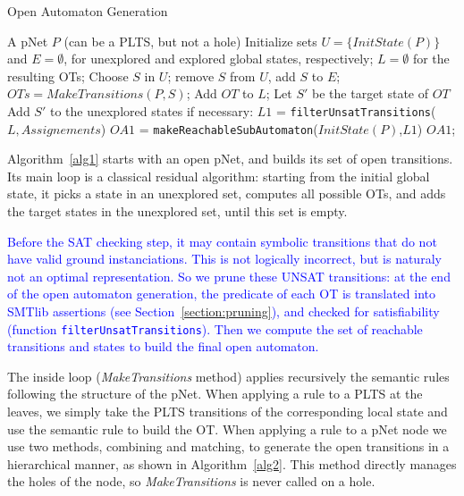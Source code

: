 \documentclass[smallcondensed]{svjour3}
\newcommand{\ERIC}[1]{\textcolor{blue}{#1}}
\newcommand{\QIN}[1]{\textcolor{airforceblue}{#1}}
\begin{document}
\begin{algorithm}[h]
  \caption{Open Automaton Generation}
  \label{alg1}
\begin{algorithmic}[1]
\Require A pNet $P$ (can be a PLTS, but not a hole)
\State Initialize sets $U=\{\mathit{InitState}(P)\}$ and $E=\emptyset$,
for unexplored and explored global states, respectively; $L=\emptyset$ for the resulting OTs;
	\State Choose $S$ in $U$; remove $S$ from $U$, add $S$ to $E$;
	\State $\mathit{OTs} = \mathit{MakeTransitions}(P, S)$;
          \State Add $\mathit{OT}$ to $L$;
          \State Let $S'$ be the target state of $\mathit{OT}$
          Add $S'$ to the unexplored states if necessary:
	  \EndFor
\EndWhile
\State \QIN{$\mathit{L1}$ = \texttt{filterUnsatTransitions}($\mathit{L,Assignements}$)}
\State \QIN{$\mathit{OA1}$ = \texttt{makeReachableSubAutomaton}($\mathit{InitState}(P)$,$\mathit{L1}$)}
\State \Return $\mathit{OA1}$;

\end{algorithmic}  
\end{algorithm}

Algorithm~\ref{alg1} starts with an open pNet, and builds its set of open
transitions. Its main loop is a classical residual algorithm: starting
from the initial global state, it picks a state in an unexplored set, 
computes all possible OTs, and adds the target states in the
unexplored set, until this set is empty.

\ERIC{Before the SAT checking step, it may contain symbolic transitions that
do not have valid ground instanciations. This is not logically
incorrect, but is naturaly not an optimal representation. So we prune
these UNSAT transitions: at the end of the open automaton generation,
the predicate of each OT is translated 
into SMTlib assertions (see Section~\ref{section:pruning}), and checked for
satisfiability (function \texttt{filterUnsatTransitions}). 
Then we compute the set of reachable transitions and states to build
the final open automaton.}

The inside loop (\emph{MakeTransitions} method) applies recursively
the semantic rules following the structure of the pNet.
When applying a rule to a PLTS at the leaves, we simply take the PLTS transitions of the
corresponding local state and use the semantic rule to build the OT.
When applying a rule to a pNet node we use two methods, combining and
matching, to generate the open transitions in a hierarchical manner,
as shown in Algorithm~\ref{alg2}. This method directly manages the
holes of the node, so \emph{MakeTransitions} is never called on a hole.
\end{document}

